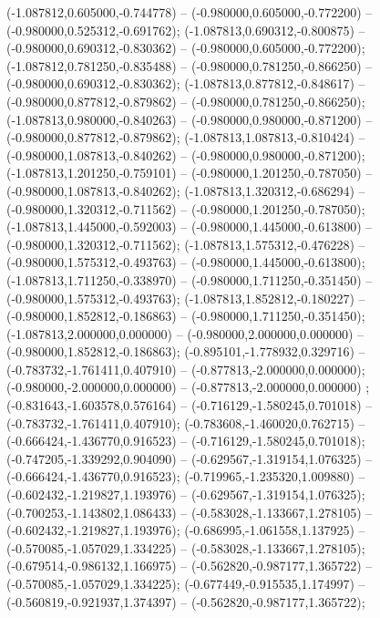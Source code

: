  (-1.087812,0.605000,-0.744778) -- (-0.980000,0.605000,-0.772200) -- (-0.980000,0.525312,-0.691762);
 (-1.087813,0.690312,-0.800875) -- (-0.980000,0.690312,-0.830362) -- (-0.980000,0.605000,-0.772200);
 (-1.087812,0.781250,-0.835488) -- (-0.980000,0.781250,-0.866250) -- (-0.980000,0.690312,-0.830362);
 (-1.087813,0.877812,-0.848617) -- (-0.980000,0.877812,-0.879862) -- (-0.980000,0.781250,-0.866250);
 (-1.087813,0.980000,-0.840263) -- (-0.980000,0.980000,-0.871200) -- (-0.980000,0.877812,-0.879862);
 (-1.087813,1.087813,-0.810424) -- (-0.980000,1.087813,-0.840262) -- (-0.980000,0.980000,-0.871200);
 (-1.087813,1.201250,-0.759101) -- (-0.980000,1.201250,-0.787050) -- (-0.980000,1.087813,-0.840262);
 (-1.087813,1.320312,-0.686294) -- (-0.980000,1.320312,-0.711562) -- (-0.980000,1.201250,-0.787050);
 (-1.087813,1.445000,-0.592003) -- (-0.980000,1.445000,-0.613800) -- (-0.980000,1.320312,-0.711562);
 (-1.087813,1.575312,-0.476228) -- (-0.980000,1.575312,-0.493763) -- (-0.980000,1.445000,-0.613800);
 (-1.087813,1.711250,-0.338970) -- (-0.980000,1.711250,-0.351450) -- (-0.980000,1.575312,-0.493763);
 (-1.087813,1.852812,-0.180227) -- (-0.980000,1.852812,-0.186863) -- (-0.980000,1.711250,-0.351450);
 (-1.087813,2.000000,0.000000) -- (-0.980000,2.000000,0.000000) -- (-0.980000,1.852812,-0.186863);
 (-0.895101,-1.778932,0.329716) -- (-0.783732,-1.761411,0.407910) -- (-0.877813,-2.000000,0.000000);
 (-0.980000,-2.000000,0.000000) -- (-0.877813,-2.000000,0.000000) ;
 (-0.831643,-1.603578,0.576164) -- (-0.716129,-1.580245,0.701018) -- (-0.783732,-1.761411,0.407910);
 (-0.783608,-1.460020,0.762715) -- (-0.666424,-1.436770,0.916523) -- (-0.716129,-1.580245,0.701018);
 (-0.747205,-1.339292,0.904090) -- (-0.629567,-1.319154,1.076325) -- (-0.666424,-1.436770,0.916523);
 (-0.719965,-1.235320,1.009880) -- (-0.602432,-1.219827,1.193976) -- (-0.629567,-1.319154,1.076325);
 (-0.700253,-1.143802,1.086433) -- (-0.583028,-1.133667,1.278105) -- (-0.602432,-1.219827,1.193976);
 (-0.686995,-1.061558,1.137925) -- (-0.570085,-1.057029,1.334225) -- (-0.583028,-1.133667,1.278105);
 (-0.679514,-0.986132,1.166975) -- (-0.562820,-0.987177,1.365722) -- (-0.570085,-1.057029,1.334225);
 (-0.677449,-0.915535,1.174997) -- (-0.560819,-0.921937,1.374397) -- (-0.562820,-0.987177,1.365722);
